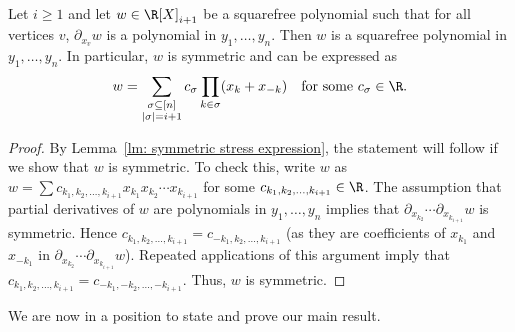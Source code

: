 \begin{lemma}\label{lm: i-stress to i+1-stress}
Let $i\geq 1$ and let $w\in \R[X]_{i+1}$ be a squarefree polynomial such that for all vertices $v$, $\partial_{x_v} w$ is a polynomial in $y_1,\ldots,y_n$. Then $w$ is a squarefree polynomial in $y_1,\ldots,y_n$. In particular, $w$ is symmetric and can be expressed as $$w=\sum_{\substack{\sigma\subseteq [n]\\|\sigma|=i+1}} c_\sigma \prod_{k\in \sigma} (x_k+x_{-k}) \quad \mbox{for some }c_\sigma\in\R.$$
\end{lemma}
\begin{proof}
By Lemma~\ref{lm: symmetric stress expression}, the statement will follow if we show that $w$ is symmetric. To check this, write $w$ as $w=\sum c_{k_1,k_2,\ldots,k_{i+1}} x_{k_1}x_{k_2}\cdots x_{k_{i+1}}$ for some $c_{k_1,k_2,\ldots,k_{i+1}}\in \R$. The assumption that partial derivatives of $w$ are polynomials in $y_1,\ldots,y_n$ implies that $\partial_{x_{k_2}}\cdots \partial_{x_{k_{i+1}}} w$ is symmetric. Hence $c_{k_1,k_2,\ldots,k_{i+1}}= c_{-k_1,k_2,\ldots,k_{i+1}}$ (as they are coefficients of $x_{k_1}$ and $x_{-k_1}$ in $\partial_{x_{k_2}}\cdots \partial_{x_{k_{i+1}}} w$). Repeated applications of this argument imply that $c_{k_1,k_2,\ldots,k_{i+1}}= c_{-k_1,-k_2,\ldots,-k_{i+1}}$. Thus, $w$ is symmetric.
\end{proof}


We are now in a position to state and prove our main result.


